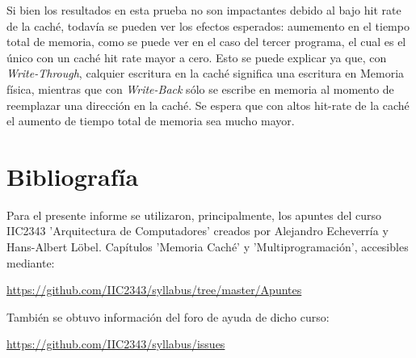 \documentclass{article}
\begin{document}
Si bien los resultados en esta prueba no son impactantes debido al bajo hit rate de la caché, todavía se pueden ver los efectos esperados: aumemento en el tiempo total de memoria, como se puede ver en el caso del tercer programa, el cual es el único con un caché hit rate mayor a cero.
Esto se puede explicar ya que, con \textit{Write-Through}, calquier escritura en la caché significa una escritura en Memoria física, mientras que con \textit{Write-Back} sólo se escribe en memoria al momento de reemplazar una dirección en la caché.
Se espera que con altos hit-rate de la caché el aumento de tiempo total de memoria sea mucho mayor.

\section{Bibliografía}

Para el presente informe se utilizaron, principalmente, los apuntes del curso IIC2343 'Arquitectura de Computadores' creados por Alejandro Echeverría y Hans-Albert Löbel. Capítulos 'Memoria Caché' y 'Multiprogramación', accesibles mediante:

\url{https://github.com/IIC2343/syllabus/tree/master/Apuntes}

También se obtuvo información del foro de ayuda de dicho curso:

\url{https://github.com/IIC2343/syllabus/issues}
\end{document}

